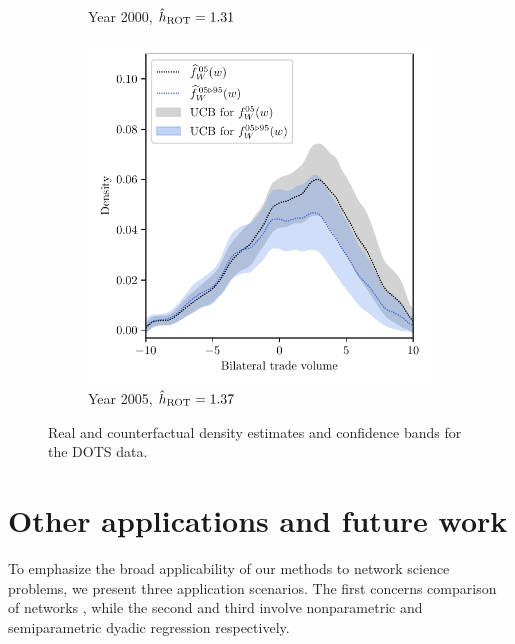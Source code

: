 \begin{figure}[ht]
\begin{subfigure}{0.32\textwidth}
    \caption{Year 2000, $\hat h_{\operatorname{ROT}} = 1.31$}
  \end{subfigure}
  \begin{subfigure}{0.32\textwidth}
    \centering
    \includegraphics[scale=0.48]{graphics/trade_plot_1995_2005.pdf}
    \caption{Year 2005, $\hat h_{\operatorname{ROT}} = 1.37$}
  \end{subfigure}
  \caption{Real and counterfactual density estimates
  and confidence bands for the DOTS data.}
  \label{fig:trade}
\end{figure}

\section{Other applications and future work}
\label{sec:future}

To emphasize the broad applicability of our methods
to network science problems,
we present three application scenarios.
The first concerns comparison of networks
\citep{kolaczyk2009statistical},
while the second and third involve
nonparametric and semiparametric dyadic regression
respectively.

